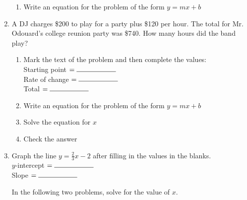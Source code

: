 \documentclass[12pt, oneside]{article}
\begin{document}
\begin{enumerate}
\begin{enumerate}
    \item Write an equation for the problem of the form $y=mx+b$\\[1.5cm]

  \end{enumerate}

  \item A DJ charges \$200 to play for a party plus \$120 per hour. The total for Mr. Odouard's college reunion party was \$740. How many hours did the band play?
  \begin{enumerate}
    \item Mark the text of the problem and then complete the values:\\[0.5cm]
    Starting point $= \rule{2cm}{0.15mm}$ \\[0.5cm]
    Rate of change $= \rule{2cm}{0.15mm}$ \\[0.5cm]
    Total $= \rule{2cm}{0.15mm}$ \\

    \item Write an equation for the problem of the form $y=mx+b$\\[1.5cm]
    \item Solve the equation for $x$ \vspace{3.5cm}
    \item Check the answer \vspace{2.5cm}
  \end{enumerate}

\newpage
\item Graph the line $y=\frac{2}{3} x -2$ after filling in the values in the blanks.\\[0.85cm]
      $y$-intercept $= \rule{2cm}{0.15mm}$ \\[0.5cm]
      Slope $= \rule{2cm}{0.15mm}$\\

\begin{center} %
\end{center}

In the following two problems, solve for the value of $x$.


\end{enumerate}
\end{document}
